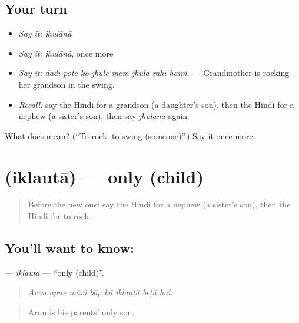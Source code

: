 \subsection*{Your turn}
\begin{itemize}
\raggedright
  \item \emph{Say it:} \emph{jhulānā}
  \item \emph{Say it:} \emph{jhulānā}, once more
  \item \emph{Say it:} \emph{dādī pote ko jhūle meṁ jhulā rahī haiṁ.} — Grandmother is rocking her grandson in the swing.
  \item \emph{Recall:} say the Hindi for a grandson (a daughter's son), then the Hindi for a nephew (a sister's son), then say \emph{jhulānā} again
\end{itemize}

\begin{tcolorbox}[breakable,colback=teal!4,colframe=teal!35!black,title={Before you move on}]
What does  mean? (\textquotedblleft{}To rock; to swing (someone)\textquotedblright{}.) Say it once more.
\end{tcolorbox}
\section[\texorpdfstring{\hi{इकलौता} (iklautā)}{इकलौता (iklautā)}]{ (iklautā) — only (child)}

\label{lesson:HI-C502-iklauta}



\begin{quote}
Before the new one: say the Hindi for a nephew (a sister's son), then the Hindi for to rock.
\end{quote}

\subsection*{You'll want to know: }
\textbf{} — \emph{iklautā} — \textquotedblleft{}only (child)\textquotedblright{}.

\begin{quote}
       
\end{quote}

\begin{quote}
\emph{Aruṇ apne māṁ bāp kā iklautā beṭā hai.}
\end{quote}

\begin{quote}
Arun is his parents' only son.
\end{quote}

